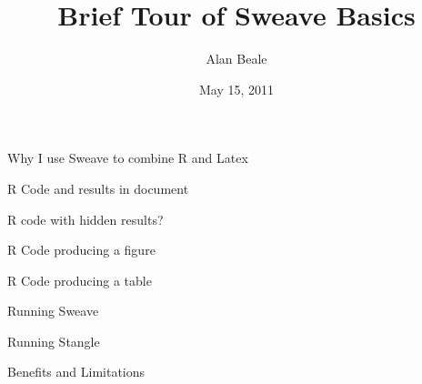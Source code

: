 \documentclass{beamer}
\title[Sweave Basics]{ Brief Tour of Sweave Basics}
\author[A. Beale ]{Alan Beale}
\date[May 2011]{May 15, 2011}
\begin{document}
\begin{frame} [plain]
  \titlepage
\end{frame}

\begin{frame}{Why I use Sweave to combine R and Latex}
\end{frame}
\begin{frame} {R Code and results in document}
\end{frame}
\begin{frame} {R code with hidden results?}
\end{frame}

\begin{frame} {R Code producing a figure}
\end{frame}
\begin{frame} {R Code producing a table}
\end{frame}
\begin{frame} {Running Sweave}
\end{frame}

\begin{frame} {Running Stangle}
\end{frame}
\begin{frame} {Benefits and Limitations}
\end{frame}
\end{document}
